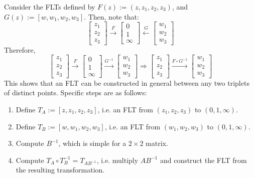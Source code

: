 \begin{shaded}
    Consider the FLTs defined by $F(z):=(z,z_1,z_2,z_3)$, and $G(z):=[w,w_1,w_2,w_3]$. Then, note that: \[\begin{bmatrix}
        z_1\\
        z_2\\
        z_3
    \end{bmatrix} \overset{F}{\longrightarrow} \begin{bmatrix}
        0\\
        1\\
        \infty
    \end{bmatrix}\overset{G}{\longleftarrow}\begin{bmatrix}
        w_1\\
        w_2\\
        w_3
    \end{bmatrix}\] Therefore, \[\begin{bmatrix}
        z_1\\
        z_2\\
        z_3
    \end{bmatrix} \overset{F}{\longrightarrow} \begin{bmatrix}
        0\\
        1\\
        \infty
    \end{bmatrix} \overset{G^{-1}}{\longrightarrow} \begin{bmatrix}
        w_1\\
        w_2\\
        w_3
    \end{bmatrix} \Longrightarrow \begin{bmatrix}
        z_1\\
        z_2\\
        z_3
    \end{bmatrix} \xrightarrow[]{F\circ G^{-1}} \begin{bmatrix}
        w_1\\
        w_2\\
        w_3
    \end{bmatrix}\] This shows that an FLT can be constructed in general between any two triplets of distinct points. Specific steps are as follows: \vspace{-1em}\begin{enumerate}
        \item[1.] Define $T_A := [z,z_1,z_2,z_3]$, i.e. an FLT from $(z_1,z_2,z_3)$ to $(0,1,\infty)$.
        \item[2.] Define $T_B:= [w,w_1,w_2,w_3]$, i.e. an FLT from $(w_1,w_2,w_3)$ to $(0,1,\infty)$.
        \item[3.] Compute $B^{-1}$, which is simple for a $2\times 2$ matrix.
        \item[4.] Compute $T_A\circ T_B^{-1} = T_{AB^{-1}}$, i.e. multiply $AB^{-1}$ and construct the FLT from the resulting transformation.
    \end{enumerate}


\end{shaded}
